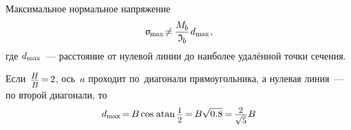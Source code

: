 \documentclass[14pt]{extarticle}
\newcommand\cosine{\operatorname{cos}}
\newcommand\atan{\operatorname{atan}}
\begin{document}
Максимальное нормальное напряжение
\[
\upsigma_{\hspace{-0.2ex}\scalebox{.75}{max}} \hspace{-.33ex}
\neq \hspace{-.15ex} \displaystyle\frac{M_{\hspace{-0.1ex}\scalebox{.8}{$b$}}}{\mathfrak{I}_{\hspace{-0.1ex}\scalebox{.8}{$b$}}} \hspace{.25ex} d_{\scalebox{.75}{max}}
\hspace{.2ex} ,
\]
где ${d_{\scalebox{.75}{max}}}$~--- расстояние от нулевой линии до наиболее удалённой точки сечения.

\vspace{.4cm}
Если ${\hspace{.2ex}\scalebox{.84}{$\displaystyle\frac{\raisebox{-0.2em}{$H$}}{B}$} \hspace{-0.3ex}=\hspace{-0.2ex} 2}$, ось~$a$ проходит по~диагонали прямоугольника, а нулевая линия~---по второй диагонали, то
\nopagebreak\vspace{-0.2em}\[
d_{\scalebox{.75}{max}} \hspace{-.3ex}
= \hspace{-.2ex}
B \cosine \hspace{.2ex} \atan \scalebox{.88}{$\displaystyle\frac{\raisebox{-0.2em}{$1$}}{2}$} \hspace{-.1ex}
= \hspace{-.2ex}
B \sqrt{0.8} \hspace{-.1ex}
= \hspace{-.2ex}
\scalebox{.88}{$ \displaystyle\frac{\raisebox{-0.18em}{$2$}}{\sqrt{5}} $} \hspace{.1ex} B
\]
\end{document}
